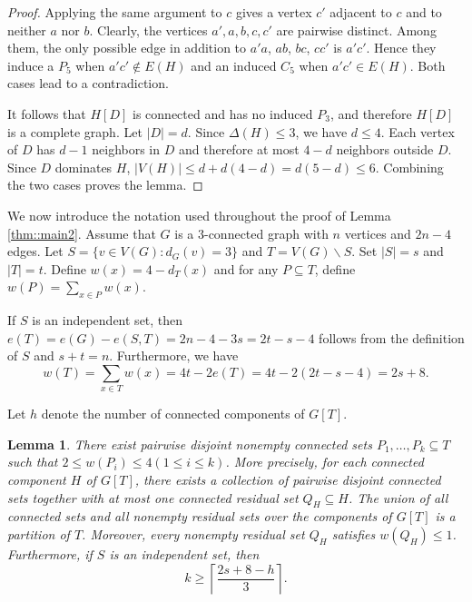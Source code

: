 \documentclass[11pt]{article}
\newtheorem{lem}[thm]{Lemma}
\theoremstyle{definition}
\begin{document}
\begin{proof}
  Applying the same argument to $c$ gives a vertex $c'$ adjacent to $c$ and to neither $a$ nor $b$. Clearly, the vertices $a',a,b,c,c'$ are pairwise distinct. Among them, the only possible edge in addition to $a'a$, $ab$, $bc$, $cc'$ is $a'c'$. Hence they induce a $P_5$ when $a'c'\notin E(H)$ and an induced $C_5$ when $a'c'\in E(H)$. Both cases lead to a contradiction.

  It follows that $H[D]$ is connected and has no induced $P_3$, and therefore $H[D]$ is a complete graph. Let $|D|=d$. Since $\Delta(H)\le3$, we have $d\le4$. Each vertex of $D$ has $d-1$ neighbors in $D$ and therefore at most $4-d$ neighbors outside $D$. Since $D$ dominates $H$, $|V(H)|\le d+d(4-d)=d(5-d)\le6$.
  Combining the two cases proves the lemma.
\end{proof}

We now introduce the notation used throughout the proof of Lemma \ref{thm::main2}. Assume that $G$ is a $3$-connected graph with $n$ vertices and $2n-4$ edges. Let $S=\{v\in V(G):d_G(v)=3\}$ and $T=V(G)\backslash S$. Set $|S|=s$ and $|T|=t$. Define $w(x)=4-d_T(x)$ and for any $P\subseteq T$, define $w(P)=\sum_{x\in P}w(x)$.

If $S$ is an independent set, then $e(T)=e(G)-e(S,T)=2n-4-3s=2t-s-4$ follows from the definition of $S$ and $s+t=n$. Furthermore, we have
\begin{equation}\label{eq::1}
  w(T)=\sum_{x\in T}w(x)=4t-2e(T)=4t-2(2t-s-4)=2s+8.
\end{equation}




Let $h$ denote the number of connected components of $G[T]$.

\begin{lem}\label{lem::3}
  There exist pairwise disjoint nonempty connected sets $P_1,\ldots,P_k\subseteq T$ such that $2\leq w(P_i)\leq 4(1\le i\le k)$. More precisely, for each connected component $H$ of $G[T]$, there exists a collection of pairwise disjoint connected sets together with at most one connected residual set $Q_H \subseteq H$. The union of all connected sets and all nonempty residual sets over the components of $G[T]$ is a partition of $T$. Moreover, every nonempty residual set $Q_H$ satisfies $w(Q_H)\leq 1$. Furthermore, if $S$ is an independent set, then
  \begin{equation}
    k\geq\left\lceil\frac{2s+8-h}{3}\right\rceil.
    \nonumber
  \end{equation}
\end{lem}
\end{document}
